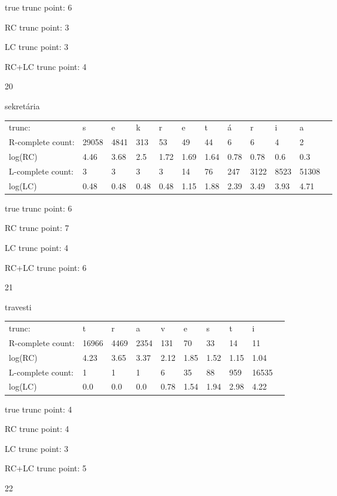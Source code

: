 \documentclass{article}
\begin{document}
true trunc point: 6

RC trunc point: 3

LC trunc point: 3

RC+LC trunc point: 4

\vspace{1em}

20

sekretária

\begin{tabular}{l|lllllllllll}
trunc: & s & e & k & r & e & t & á & r & i & a & \\ 
R-complete count: & 29058 & 4841 & 313 & 53 & 49 & 44 & 6 & 6 & 4 & 2 & \\ 
log(RC) & 4.46 & 3.68 & 2.5 & 1.72 & 1.69 & 1.64 & 0.78 & 0.78 & 0.6 & 0.3 & \\ 
L-complete count: & 3 & 3 & 3 & 3 & 14 & 76 & 247 & 3122 & 8523 & 51308 & \\ 
log(LC) & 0.48 & 0.48 & 0.48 & 0.48 & 1.15 & 1.88 & 2.39 & 3.49 & 3.93 & 4.71 & \\ 
\end{tabular}

true trunc point: 6

RC trunc point: 7

LC trunc point: 4

RC+LC trunc point: 6

\newpage

21

travesti

\begin{tabular}{l|lllllllll}
trunc: & t & r & a & v & e & s & t & i & \\ 
R-complete count: & 16966 & 4469 & 2354 & 131 & 70 & 33 & 14 & 11 & \\ 
log(RC) & 4.23 & 3.65 & 3.37 & 2.12 & 1.85 & 1.52 & 1.15 & 1.04 & \\ 
L-complete count: & 1 & 1 & 1 & 6 & 35 & 88 & 959 & 16535 & \\ 
log(LC) & 0.0 & 0.0 & 0.0 & 0.78 & 1.54 & 1.94 & 2.98 & 4.22 & \\ 
\end{tabular}

true trunc point: 4

RC trunc point: 4

LC trunc point: 3

RC+LC trunc point: 5

\vspace{1em}

22
\end{document}
